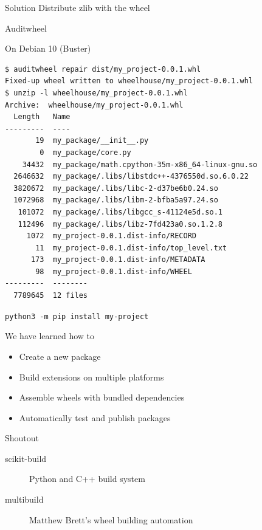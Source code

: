 \documentclass[pdf]{beamer}
\begin{document}
\begin{frame}
    \begin{block}{Solution}
        Distribute zlib with the wheel
    \end{block}

    \note {
    }
\end{frame}

\begin{frame}[fragile]{Auditwheel}
    \begin{block}{On Debian 10 (Buster)}
        \begin{lstlisting}
$ auditwheel repair dist/my_project-0.0.1.whl
Fixed-up wheel written to wheelhouse/my_project-0.0.1.whl
$ unzip -l wheelhouse/my_project-0.0.1.whl
Archive:  wheelhouse/my_project-0.0.1.whl
  Length   Name
---------  ----
       19  my_package/__init__.py
        0  my_package/core.py
    34432  my_package/math.cpython-35m-x86_64-linux-gnu.so
  2646632  my_package/.libs/libstdc++-4376550d.so.6.0.22
  3820672  my_package/.libs/libc-2-d37be6b0.24.so
  1072968  my_package/.libs/libm-2-bfba5a97.24.so
   101072  my_package/.libs/libgcc_s-41124e5d.so.1
   112496  my_package/.libs/libz-7fd423a0.so.1.2.8
     1072  my_project-0.0.1.dist-info/RECORD
       11  my_project-0.0.1.dist-info/top_level.txt
      173  my_project-0.0.1.dist-info/METADATA
       98  my_project-0.0.1.dist-info/WHEEL
---------  --------
  7789645  12 files
        \end{lstlisting}
    \end{block}
\end{frame}

\begin{frame}[fragile]{}
    \verb|python3 -m pip install my-project|
\end{frame}

\begin{frame}{We have learned how to}
    \begin{itemize}
        \item Create a new package
        \item Build extensions on multiple platforms
        \item Assemble wheels with bundled dependencies
        \item Automatically test and publish packages
    \end{itemize}
\end{frame}

\begin{frame}{Shoutout}
    \begin{description}
        \item [scikit-build] Python and C++ build system
        \item [multibuild] Matthew Brett's wheel building automation
    \end{description}
\end{frame}
\end{document}
